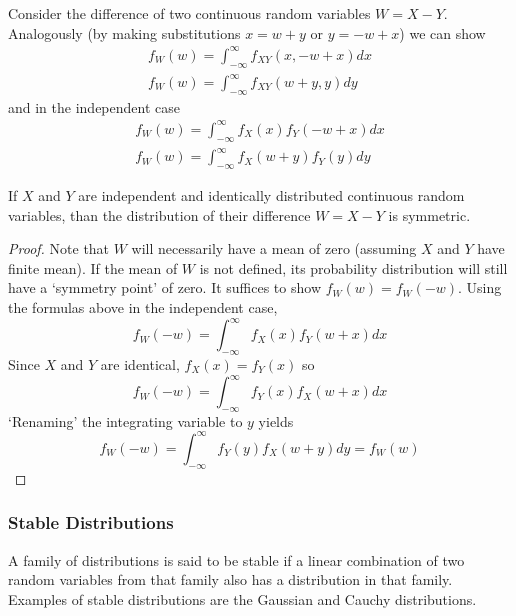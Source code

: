 \documentclass[11pt]{report} %
\begin{document}
Consider the difference of two continuous random variables $W = X - Y$. Analogously (by making substitutions $x = w + y$ or $y = -w + x$) we can show
\begin{gather}
f_{W}\left(w\right) = \int_{-\infty}^{\infty}f_{XY}\left(x, -w + x\right)dx \\
f_{W}\left(w\right) = \int_{-\infty}^{\infty}f_{XY}\left(w + y, y\right)dy
\end{gather}
and in the independent case
\begin{gather}
f_{W}\left(w\right) = \int_{-\infty}^{\infty}f_{X}\left(x\right)f_{Y}\left(-w + x\right)dx \\
f_{W}\left(w\right) = \int_{-\infty}^{\infty}f_{X}\left(w + y\right)f_{Y}\left(y\right)dy
\end{gather}
\begin{theorem}
If $X$ and $Y$ are independent and identically distributed continuous random variables, than the distribution of their difference $W = X - Y$ is symmetric.
\end{theorem}
\begin{proof}
Note that $W$ will necessarily have a mean of zero (assuming $X$ and $Y$ have finite mean). If the mean of $W$ is not defined, its probability distribution will still have a `symmetry point' of zero. It suffices to show $f_{W}\left(w\right) = f_{W}\left(-w\right)$. Using the formulas above in the independent case,
\begin{equation}
f_{W}\left(-w\right) = \int_{-\infty}^{\infty}f_{X}\left(x\right)f_{Y}\left(w + x\right)dx
\end{equation}
Since $X$ and $Y$ are identical, $f_{X}\left(x\right) = f_{Y}\left(x\right)$ so
\begin{equation}
f_{W}\left(-w\right) = \int_{-\infty}^{\infty}f_{Y}\left(x\right)f_{X}\left(w + x\right)dx
\end{equation}
`Renaming' the integrating variable to $y$ yields
\begin{equation}
f_{W}\left(-w\right) = \int_{-\infty}^{\infty}f_{Y}\left(y\right)f_{X}\left(w + y\right)dy = f_{W}\left(w\right)
\end{equation}
\end{proof}

\subsubsection{Stable Distributions}

A family of distributions is said to be stable if a linear combination of two random variables from that family also has a distribution in that family. Examples of stable distributions are the Gaussian and Cauchy distributions.
\end{document}
